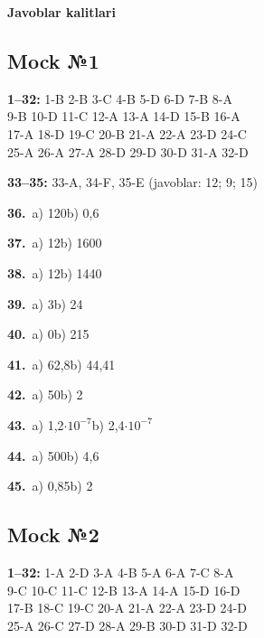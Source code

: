 \documentclass[11pt,a4paper]{article}
\begin{document}
\begin{center}{\Large\textbf{Javoblar kalitlari}}\end{center}
\subsection*{Mock №1}
\noindent\textbf{1–32:} 1-B 2-B 3-C 4-B 5-D 6-D 7-B 8-A\\ 9-B 10-D 11-C 12-A 13-A 14-D 15-B 16-A\\ 17-A 18-D 19-C 20-B 21-A 22-A 23-D 24-C\\ 25-A 26-A 27-A 28-D 29-D 30-D 31-A 32-D\par
\noindent\textbf{33–35:} 33-A, 34-F, 35-E \quad (javoblar: 12; 9; 15)\par
\noindent\textbf{36.}\ a) 120\quad b) 0,6\par
\noindent\textbf{37.}\ a) 12\quad b) 1600\par
\noindent\textbf{38.}\ a) 12\quad b) 1440\par
\noindent\textbf{39.}\ a) 3\quad b) 24\par
\noindent\textbf{40.}\ a) 0\quad b) 215\par
\noindent\textbf{41.}\ a) 62,8\quad b) 44,41\par
\noindent\textbf{42.}\ a) 50\quad b) 2\par
\noindent\textbf{43.}\ a) 1,2$\cdot10^{-7}$\quad b) 2,4$\cdot10^{-7}$\par
\noindent\textbf{44.}\ a) 500\quad b) 4,6\par
\noindent\textbf{45.}\ a) 0,85\quad b) 2\par
{}\par\bigskip
{}\subsection*{Mock №2}
\noindent\textbf{1–32:} 1-A 2-D 3-A 4-B 5-A 6-A 7-C 8-A\\ 9-C 10-C 11-C 12-B 13-A 14-A 15-D 16-D\\ 17-B 18-C 19-C 20-A 21-A 22-A 23-D 24-D\\ 25-A 26-C 27-D 28-A 29-B 30-D 31-D 32-D\par
\end{document}
